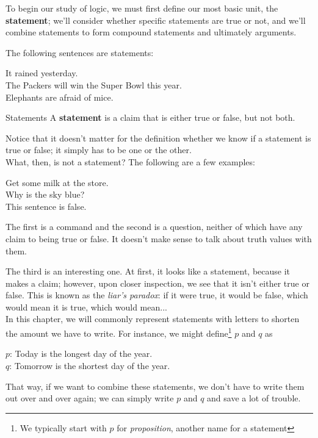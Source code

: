 \setcounter{ExampleCounter}{1}
To begin our study of logic, we must first define our most basic unit, the \textbf{statement}; we'll consider whether specific statements are true or not, and we'll combine statements to form compound statements and ultimately arguments.

The following sentences are statements:
\begin{center}
It rained yesterday.\\
The Packers will win the Super Bowl this year.\\
Elephants are afraid of mice.
\end{center}

\begin{proc}{Statements}
A \textbf{statement} is a claim that is either true or false, but not both.
\end{proc}

Notice that it doesn't matter for the definition whether we know if a statement is true or false; it simply has to be one or the other.\\

What, then, is not a statement?  The following are a few examples:
\begin{center}
Get some milk at the store.\\
Why is the sky blue?\\
This sentence is false.
\end{center}
The first is a command and the second is a question, neither of which have any claim to being true or false.  It doesn't make sense to talk about truth values with them.

The third is an interesting one.  At first, it looks like a statement, because it makes a claim; however, upon closer inspection, we see that it isn't either true or false.  This is known as the \textit{liar's paradox}: if it were true, it would be false, which would mean it is true, which would mean...\\

In this chapter, we will commonly represent statements with letters to shorten the amount we have to write.  For instance, we might define\footnote{We typically start with $p$ for \textit{proposition}, another name for a statement} $p$ and $q$ as
\begin{center}
$p$: Today is the longest day of the year.\\
$q$: Tomorrow is the shortest day of the year.
\end{center}
That way, if we want to combine these statements, we don't have to write them out over and over again; we can simply write $p$ and $q$ and save a lot of trouble.\\

